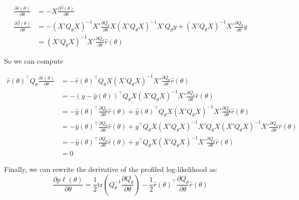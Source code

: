\documentclass{article}
\begin{document}
\begin{align}
\frac{\partial \hat r(\theta)}{\partial \theta} &= -X\frac{\partial \hat\beta(\theta)}{\partial \theta} \\
\frac{\partial \hat \beta(\theta)}{\partial \theta} &= -(X'Q_\theta X)^{-1}X'\frac{\partial Q_\theta}{\partial \theta}X (X'Q_\theta X)^{-1} X'Q_\theta y + (X'Q_\theta X)^{-1}X' \frac{\partial Q_\theta}{\partial \theta}y\\
&=(X'Q_\theta X)^{-1}X'\frac{\partial Q_\theta}{\partial \theta} \hat r(\theta)
\end{align}

So we can compute

\begin{align*}
  \hat r(\theta)^\top Q_\theta \frac{\partial \hat r(\theta)}{\partial \theta} &= - \hat r(\theta)^\top Q_\theta X(X'Q_\theta X)^{-1}X'\frac{\partial Q_\theta}{\partial \theta} \hat r(\theta)\\
&= - (y-\hat y(\theta))^\top Q_\theta X(X'Q_\theta X)^{-1}X'\frac{\partial Q_\theta}{\partial \theta} \hat r(\theta)\\
&= -\hat y(\theta)^\top \frac{\partial Q_\theta}{\partial \theta} \hat r(\theta) + \hat y(\theta)^\top Q_\theta X(X'Q_\theta X)^{-1}X'\frac{\partial Q_\theta}{\partial \theta} \hat r(\theta)\\
&= -\hat y(\theta)^\top \frac{\partial Q_\theta}{\partial \theta} \hat r(\theta) + y^\top Q_\theta X(X'Q_\theta X)^{-1}X' Q_\theta X(X'Q_\theta X)^{-1}X'\frac{\partial Q_\theta}{\partial \theta} \hat r(\theta)\\
&= -\hat y(\theta)^\top \frac{\partial Q_\theta}{\partial \theta} \hat r(\theta) + y^\top Q_\theta X(X'Q_\theta X)^{-1}X'\frac{\partial Q_\theta}{\partial \theta} \hat r(\theta)\\
&= 0
\end{align*}

Finally, we can rewrite the derivative of the profiled log-likelihood as:
\[\frac{\partial p\ell(\theta)}{\partial \theta} = \frac{1}{2} \mathrm{tr}\left(Q_\theta^{-1} \frac{\partial Q_\theta}{\partial \theta}\right) 
 -  \frac{1}{2}\hat r(\theta)^\top  \frac{\partial Q_\theta}{\partial \theta} \hat r(\theta) \]
\end{document}
